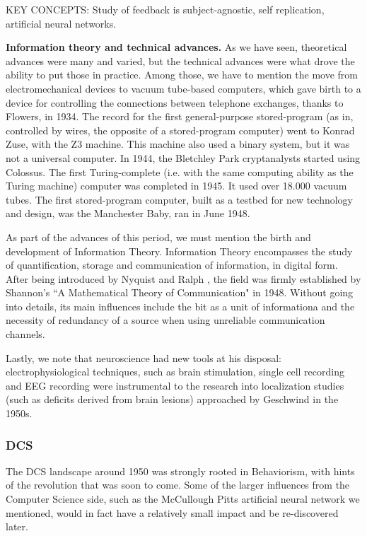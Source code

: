 \documentclass[../main.tex]{subfiles}
\begin{document}
KEY CONCEPTS: Study of feedback is subject-agnostic, self replication, artificial neural networks.

\vspace{4pt}
\textbf{Information theory and technical advances.} As we have seen, theoretical advances were many and varied, but the technical advances were what drove the ability to put those in practice. Among those, we have to mention the move from electromechanical devices to vacuum tube-based computers, which gave birth to a device for controlling the connections between telephone exchanges, thanks to Flowers, in 1934. The record for the first general-purpose stored-program (as in, controlled by wires, the opposite of a stored-program computer) went to Konrad Zuse, with the Z3 machine. This machine also used a binary system, but it was not a universal computer. In 1944, the Bletchley Park cryptanalysts started using Colossus. The first Turing-complete (i.e. with the same computing ability as the Turing machine) computer was completed in 1945. It used over 18.000 vacuum tubes. The first stored-program computer, built as a testbed for new technology and design, was the Manchester Baby, ran in June 1948\cite{ComputerResurrectionIssue2012}.

As part of the advances of this period, we must mention the birth and development of Information Theory. Information Theory encompasses the study of quantification, storage and communication of information, in digital form. After being introduced by Nyquist and Ralph \cite{nyquistCertainTopicsTelegraph1928}, the field was firmly established by Shannon's ``A Mathematical Theory of Communication" in 1948. Without going into details, its main influences include the bit as a unit of informationa and the necessity of redundancy of a source when using unreliable communication channels.

Lastly, we note that neuroscience had new tools at his disposal: electrophysiological techniques, such as brain stimulation, single cell recording and EEG recording \cite{InternationalEncyclopediaSocial} were instrumental to the research into localization studies (such as deficits derived from brain lesions) approached by Geschwind in the 1950s.

\subsubsection{DCS}
The DCS landscape around 1950 was strongly rooted in Behaviorism, with hints of the revolution that was soon to come. Some of the larger influences from the Computer Science side, such as the McCullough Pitts artificial neural network we mentioned, would in fact have a relatively small impact and be re-discovered later.
\end{document}
